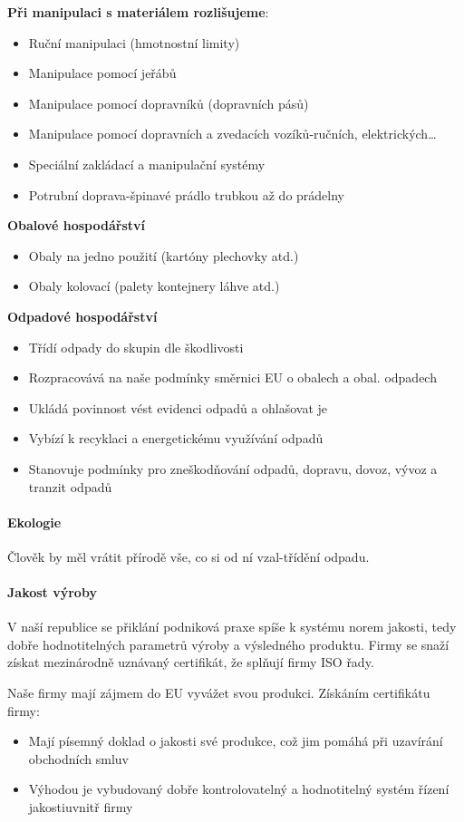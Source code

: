 \documentclass[11pt,a4paper,twoside]{book}
\begin{document}
	\textbf*{Při manipulaci s materiálem rozlišujeme}:
	\begin{itemize}
		\item Ruční manipulaci (hmotnostní limity)
		\item Manipulace pomocí jeřábů
		\item Manipulace pomocí dopravníků (dopravních pásů)
		\item Manipulace pomocí dopravních a zvedacích vozíků-ručních, elektrických\ldots
		\item Speciální zakládací a manipulační systémy
		\item Potrubní doprava-špinavé prádlo trubkou až do prádelny
	\end{itemize}

	\textbf{Obalové hospodářství}
	\begin{itemize}
		\item Obaly na jedno použití (kartóny plechovky atd.)
		\item Obaly kolovací (palety kontejnery láhve atd.)
	\end{itemize}

	\textbf{Odpadové hospodářství}
	\begin{itemize}
		\item Třídí odpady do skupin dle škodlivosti
		\item Rozpracovává na naše podmínky směrnici EU o obalech a obal. odpadech
		\item Ukládá povinnost vést evidenci odpadů a ohlašovat je
		\item Vybízí k recyklaci a energetickému využívání odpadů
		\item Stanovuje podmínky pro zneškodňování odpadů, dopravu, dovoz, vývoz a tranzit odpadů
	\end{itemize}

	\paragraph*{Ekologie}
	Člověk by měl vrátit přírodě vše, co si od ní vzal-třídění odpadu.

	\paragraph*{Jakost výroby}
	V naší republice se přiklání podniková praxe spíše k systému norem jakosti, tedy dobře hodnotitelných parametrů výroby a výsledného produktu. Firmy se snaží získat mezinárodně uznávaný certifikát, že splňují firmy ISO řady. \par Naše firmy mají zájmem do EU vyvážet svou produkci. Získáním certifikátu firmy:
	\begin{itemize}
		\item Mají písemný doklad o jakosti své produkce, což jim pomáhá při uzavírání obchodních smluv
		\item Výhodou je vybudovaný dobře kontrolovatelný a hodnotitelný systém řízení jakostiuvnitř firmy
	\end{itemize}
\end{document}
